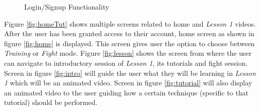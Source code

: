 \begin{figure}
{  }
  \quad 
  \caption{Login/Signup Functionality} 
  \centering
  \label{fig:startingScreens}
\end{figure}


Figure \ref{fig:homeTut} shows multiple screens related to home and \textit{Lesson 1} videos. After the user has been granted access to their account, home screen as shown in figure \ref{fig:home} is displayed. This screen gives user the option to choose between \textit{Training} or \textit{Fight} mode. Figure \ref{fig:lesson} shows the screen from where the user can navigate to introductory session of \textit{Lesson 1}, its tutorials and fight session. Screen in figure \ref{fig:intro} will guide the user what they will be learning in \textit{Lesson 1} which will be an animated video. Screen in figure \ref{fig:tutorial} will also display an animated video to the user guiding how a certain technique (specific to that tutorial) should be performed. 


